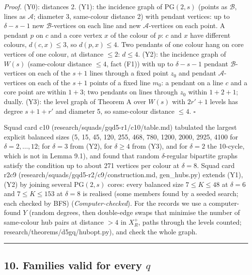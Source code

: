 \documentclass[
  11pt,
]{article}
\begin{document}
\emph{Proof.} (Y0): distances 2. (Y1): the incidence graph of
\(\mathrm{PG}(2,s)\) (points as \(\mathcal B\), lines as \(\mathcal A\);
diameter 3, same-colour distance 2) with pendant vertices: up to
\(\delta-s-1\) new \(\mathcal B\)-vertices on each line and new
\(\mathcal A\)-vertices on each point. A pendant \(p\) on \(c\) and a
core vertex \(x\) of the colour of \(p\): \(c\) and \(x\) have different
colours, \(d(c,x)\le 3\), so \(d(p,x)\le 4\). Two pendants of one colour
hang on core vertices of one colour, at distance \(\le 2\): \(d\le 4\).
(Y2): the incidence graph of \(W(s)\) (same-colour distance \(\le 4\),
fact (F1)) with up to \(\delta-s-1\) pendant \(\mathcal B\)-vertices on
each of the \(s+1\) lines through a fixed point \(z_0\) and pendant
\(\mathcal A\)-vertices on each of the \(s+1\) points of a fixed line
\(m_0\): a pendant on a line \(c\) and a core point are within \(1+3\);
two pendants on lines through \(z_0\) within \(1+2+1\); dually. (Y3):
the level graph of Theorem A over \(W(s)\) with \(2r'+1\) levels has
degree \(s+1+r'\) and diameter 5, so same-colour distance \(\le 4\).
\(\square\)

Squad card c10 (research/squads/gqd5-r1/c10/table.md) tabulated the
largest explicit balanced sizes (5, 15, 45, 120, 255, 468, 780, 1200,
2000, 2925, 4100 for \(\delta = 2,\dots,12\); for \(\delta = 3\) from
(Y2), for \(\delta\ge 4\) from (Y3), and for \(\delta = 2\) the
10-cycle, which is not in Lemma 9.1), and found that random
\(\delta\)-regular bipartite graphs satisfy the condition up to about
271 vertices per colour at \(\delta = 8\). Squad card r2c9
(research/squads/gqd5-r2/c9/construction.md, gen\_hubs.py) extends (Y1),
(Y2) by joining several \(\mathrm{PG}(2,s)\) cores: every balanced size
\(7\le K\le 48\) at \(\delta = 6\) and \(7\le K\le 153\) at
\(\delta = 8\) is realised (some members found by a seeded search; each
checked by BFS) (\emph{Computer-checked}). For the records we use a
computer-found \(Y\) (random degrees, then double-edge swaps that
minimise the number of same-colour hub pairs at distance \(>4\) in
\(X_R^+\), paths through the levels counted;
research/theorems/d5gq/hubopt.py), and check the whole graph.

\begin{center}\rule{0.5\linewidth}{0.5pt}\end{center}

\hypertarget{families-valid-for-every-q}{%
\subsection{\texorpdfstring{10. Families valid for every
\(q\)}{10. Families valid for every q}}\label{families-valid-for-every-q}}
\end{document}
